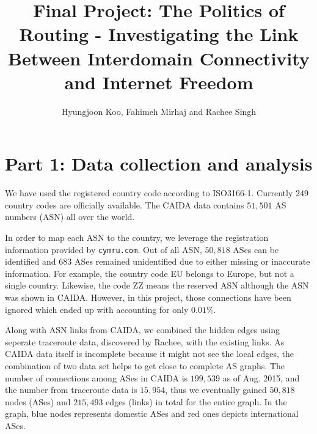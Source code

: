 \documentclass{article}
\begin{document}
\title{Final Project: The Politics of Routing - Investigating the Link Between
Interdomain Connectivity and Internet Freedom}
\author{Hyungjoon Koo, Fahimeh Mirhaj and Rachee Singh}
\maketitle

\section*{Part 1: Data collection and analysis}

\bigskip

\noindent 
We have used the registered country code according to ISO3166-1. Currently $249$
country codes are officially available. The CAIDA data contains $51,501$ AS
numbers (ASN) all over the world.
\bigskip

\noindent 
In order to map each ASN to the country, we leverage the registration
information provided by \texttt{cymru.com}. Out of all ASN, $50,818$ ASes can be
identified and $683$ ASes remained unidentified due to either missing or
inaccurate information. For example, the country code EU belongs to Europe, but
not a single country. Likewise, the code ZZ means the reserved ASN although the
ASN was shown in CAIDA. However, in this project, those connections have been
ignored which ended up with accounting for only $0.01\%$.
\bigskip

\noindent 
Along with ASN links from CAIDA, we combined the hidden edges using seperate
traceroute data, discovered by Rachee, with the existing links. As CAIDA data itself is
incomplete because it might not see the local edges, the combination of two data
set helps to get close to complete AS graphs. The number of connections among
ASes in CAIDA is $199,539$ as of Aug. 2015, and the number from traceroute data 
is $15,954$, thus we eventually gained $50,818$ nodes (ASes) and $215,493$ edges 
(links) in total for the entire graph. In the graph, blue nodes represents 
domestic ASes and red ones depicts international ASes.
\end{document}

